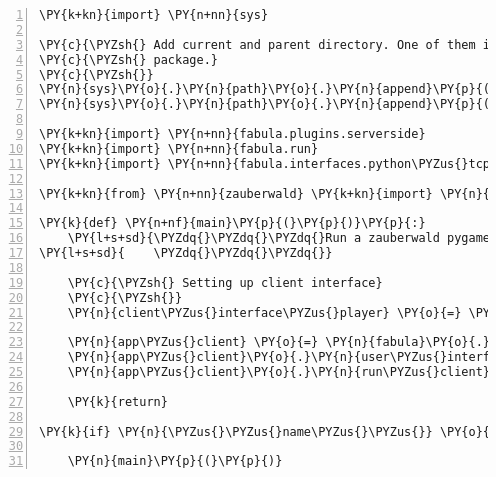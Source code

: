 \begin{Verbatim}[commandchars=\\\{\},numbers=left,firstnumber=1,stepnumber=1]
\PY{k+kn}{import} \PY{n+nn}{sys}

\PY{c}{\PYZsh{} Add current and parent directory. One of them is supposed to contain the fabula}
\PY{c}{\PYZsh{} package.}
\PY{c}{\PYZsh{}}
\PY{n}{sys}\PY{o}{.}\PY{n}{path}\PY{o}{.}\PY{n}{append}\PY{p}{(}\PY{l+s}{\PYZdq{}}\PY{l+s}{../}\PY{l+s}{\PYZdq{}}\PY{p}{)}
\PY{n}{sys}\PY{o}{.}\PY{n}{path}\PY{o}{.}\PY{n}{append}\PY{p}{(}\PY{l+s}{\PYZdq{}}\PY{l+s}{./}\PY{l+s}{\PYZdq{}}\PY{p}{)}

\PY{k+kn}{import} \PY{n+nn}{fabula.plugins.serverside}
\PY{k+kn}{import} \PY{n+nn}{fabula.run}
\PY{k+kn}{import} \PY{n+nn}{fabula.interfaces.python\PYZus{}tcp}

\PY{k+kn}{from} \PY{n+nn}{zauberwald} \PY{k+kn}{import} \PY{n}{ZWUI}

\PY{k}{def} \PY{n+nf}{main}\PY{p}{(}\PY{p}{)}\PY{p}{:}
    \PY{l+s+sd}{\PYZdq{}\PYZdq{}\PYZdq{}Run a zauberwald pygame client.}
\PY{l+s+sd}{    \PYZdq{}\PYZdq{}\PYZdq{}}

    \PY{c}{\PYZsh{} Setting up client interface}
    \PY{c}{\PYZsh{}}
    \PY{n}{client\PYZus{}interface\PYZus{}player} \PY{o}{=} \PY{n}{fabula}\PY{o}{.}\PY{n}{interfaces}\PY{o}{.}\PY{n}{python\PYZus{}tcp}\PY{o}{.}\PY{n}{TCPClientInterface}\PY{p}{(}\PY{p}{)}

    \PY{n}{app\PYZus{}client} \PY{o}{=} \PY{n}{fabula}\PY{o}{.}\PY{n}{run}\PY{o}{.}\PY{n}{App}\PY{p}{(}\PY{n}{timeout}\PY{o}{=}\PY{l+m+mi}{0}\PY{p}{)}
    \PY{n}{app\PYZus{}client}\PY{o}{.}\PY{n}{user\PYZus{}interface\PYZus{}class} \PY{o}{=} \PY{n}{ZWUI}
    \PY{n}{app\PYZus{}client}\PY{o}{.}\PY{n}{run\PYZus{}client}\PY{p}{(}\PY{l+m+mi}{30}\PY{p}{,} \PY{n}{client\PYZus{}interface\PYZus{}player}\PY{p}{)}

    \PY{k}{return}

\PY{k}{if} \PY{n}{\PYZus{}\PYZus{}name\PYZus{}\PYZus{}} \PY{o}{==} \PY{l+s}{\PYZdq{}}\PY{l+s}{\PYZus{}\PYZus{}main\PYZus{}\PYZus{}}\PY{l+s}{\PYZdq{}}\PY{p}{:}

    \PY{n}{main}\PY{p}{(}\PY{p}{)}
\end{Verbatim}
